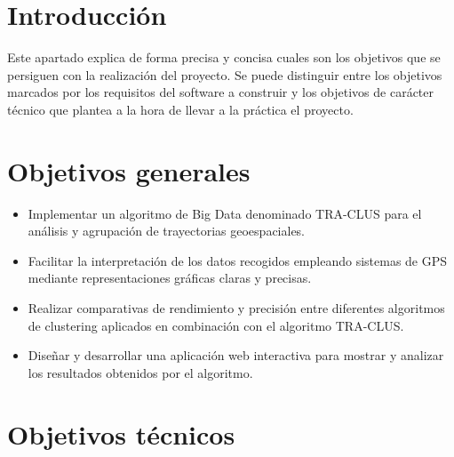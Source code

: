 
\section{Introducción}

Este apartado explica de forma precisa y concisa cuales son los objetivos que se persiguen con la realización del proyecto. Se puede distinguir entre los objetivos marcados por los requisitos del software a construir y los objetivos de carácter técnico que plantea a la hora de llevar a la práctica el proyecto.

\section{Objetivos generales}\label{objetivos-generales}

\begin{itemize}
    \item Implementar un algoritmo de Big Data denominado TRA-CLUS para el análisis y agrupación de trayectorias geoespaciales.
    \item Facilitar la interpretación de los datos recogidos empleando sistemas de GPS mediante representaciones gráficas claras y precisas.
    \item Realizar comparativas de rendimiento y precisión entre diferentes algoritmos de clustering aplicados en combinación con el algoritmo TRA-CLUS.
    \item Diseñar y desarrollar una aplicación web interactiva para mostrar y analizar los resultados obtenidos por el algoritmo.
\end{itemize}

\section{Objetivos técnicos}\label{objetivos-tecnicos}

